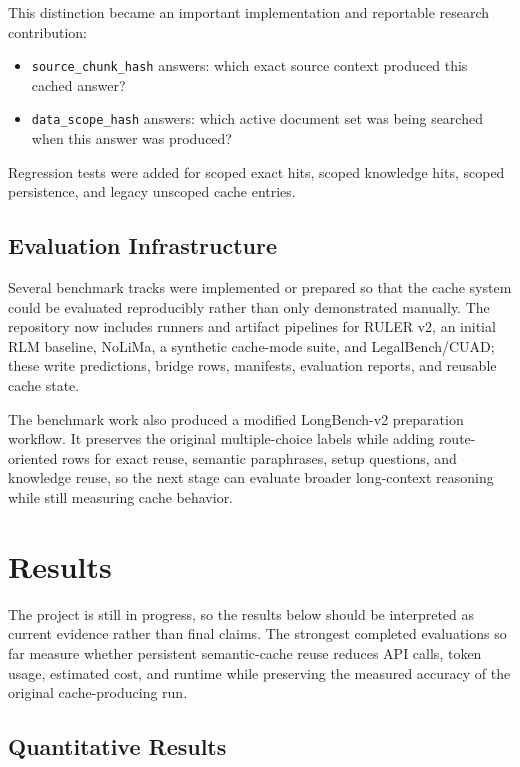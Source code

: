 \documentclass[10pt,a4paper]{article}
\begin{document}
This distinction became an important implementation and reportable research contribution:

\begin{itemize}
\item \texttt{source\_chunk\_hash} answers: which exact source context produced this cached answer?
\item \texttt{data\_scope\_hash} answers: which active document set was being searched when this answer was produced?
\end{itemize}

Regression tests were added for scoped exact hits, scoped knowledge hits, scoped persistence, and legacy unscoped cache entries.

\subsection{Evaluation Infrastructure}

Several benchmark tracks were implemented or prepared so that the cache system could be evaluated reproducibly rather than only demonstrated manually. The repository now includes runners and artifact pipelines for RULER v2, an initial RLM baseline, NoLiMa, a synthetic cache-mode suite, and LegalBench/CUAD; these write predictions, bridge rows, manifests, evaluation reports, and reusable cache state.

The benchmark work also produced a modified LongBench-v2 preparation workflow. It preserves the original multiple-choice labels while adding route-oriented rows for exact reuse, semantic paraphrases, setup questions, and knowledge reuse, so the next stage can evaluate broader long-context reasoning while still measuring cache behavior.

\section{Results}

The project is still in progress, so the results below should be interpreted as current evidence rather than final claims. The strongest completed evaluations so far measure whether persistent semantic-cache reuse reduces API calls, token usage, estimated cost, and runtime while preserving the measured accuracy of the original cache-producing run.

\subsection{Quantitative Results}
\end{document}
